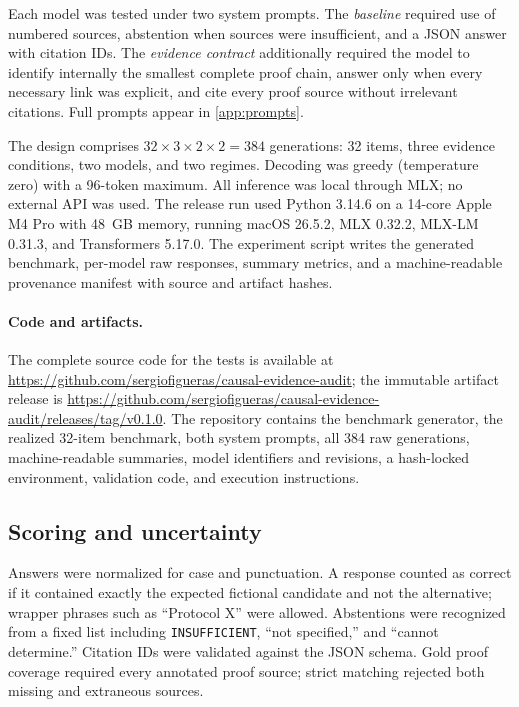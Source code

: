 \documentclass[10pt,twocolumn]{article}
\begin{document}
Each model was tested under two system prompts. The \emph{baseline} required use of numbered sources, abstention when sources were insufficient, and a JSON answer with citation IDs. The \emph{evidence contract} additionally required the model to identify internally the smallest complete proof chain, answer only when every necessary link was explicit, and cite every proof source without irrelevant citations. Full prompts appear in \cref{app:prompts}.

The design comprises $32\times 3\times 2\times 2=384$ generations: 32 items, three evidence conditions, two models, and two regimes. Decoding was greedy (temperature zero) with a 96-token maximum. All inference was local through MLX; no external API was used. The release run used Python 3.14.6 on a 14-core Apple M4 Pro with 48~GB memory, running macOS 26.5.2, MLX 0.32.2, MLX-LM 0.31.3, and Transformers 5.17.0. The experiment script writes the generated benchmark, per-model raw responses, summary metrics, and a machine-readable provenance manifest with source and artifact hashes.

\paragraph{Code and artifacts.}
The complete source code for the tests is available at \url{https://github.com/sergiofigueras/causal-evidence-audit}; the immutable artifact release is \url{https://github.com/sergiofigueras/causal-evidence-audit/releases/tag/v0.1.0}. The repository contains the benchmark generator, the realized 32-item benchmark, both system prompts, all 384 raw generations, machine-readable summaries, model identifiers and revisions, a hash-locked environment, validation code, and execution instructions.

\subsection{Scoring and uncertainty}

Answers were normalized for case and punctuation. A response counted as correct if it contained exactly the expected fictional candidate and not the alternative; wrapper phrases such as ``Protocol X'' were allowed. Abstentions were recognized from a fixed list including \texttt{INSUFFICIENT}, ``not specified,'' and ``cannot determine.'' Citation IDs were validated against the JSON schema. Gold proof coverage required every annotated proof source; strict matching rejected both missing and extraneous sources.
\end{document}
